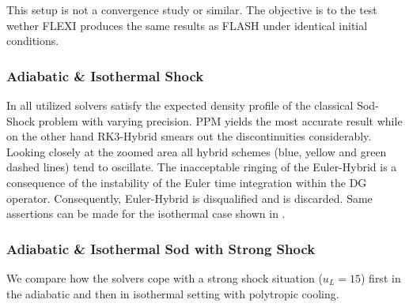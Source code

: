 This setup is not a convergence study or similar. The objective is to the test
wether FLEXI produces the same results as FLASH under identical initial
conditions.


\subsubsection{Adiabatic \& Isothermal Shock}
In  all utilized solvers satisfy the
expected density profile of the classical Sod-Shock problem with varying
precision. PPM yields the most accurate result while on the other hand
RK3-Hybrid smears out the discontinuities considerably. Looking closely at the
zoomed area all hybrid schemes (blue, yellow and green dashed lines) tend to
oscillate.  The inacceptable ringing of the Euler-Hybrid is a consequence of
the instability of the Euler time integration within the DG operator.
Consequently, Euler-Hybrid is disqualified and is discarded.  Same assertions
can be made for the isothermal case shown in
.

\subsubsection{Adiabatic \& Isothermal Sod with Strong Shock}
We compare how the solvers cope with a strong shock situation ($u_L = 15$)
first in the adiabatic and then in isothermal setting with polytropic cooling.

